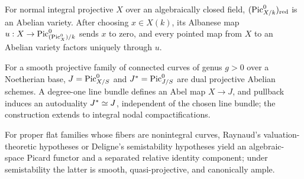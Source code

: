 \begin{remark}\label{kps-rmk-albanese}
For normal integral projective $X$ over an algebraically closed field,
$(\operatorname{Pic}^0_{X/k})_{\mathrm{red}}$ is an Abelian variety. After choosing
$x\in X(k)$, its Albanese map $u:X\to\operatorname{Pic}^0_{(\operatorname{Pic}^0_X)/k}$ sends $x$ to zero,
and every pointed map from $X$ to an Abelian variety factors uniquely through
$u$.
\end{remark}

\begin{remark}\label{kps-rmk-jacobian-autoduality}
For a smooth projective family of connected curves of genus $g>0$ over a
Noetherian base, $J=\operatorname{Pic}^0_{X/S}$ and $J^*=\operatorname{Pic}^0_{J/S}$ are dual projective
Abelian schemes. A degree-one line bundle defines an Abel map $X\to J$, and
pullback induces an autoduality $J^*\simeq J$, independent of the chosen line
bundle; the construction extends to integral nodal compactifications.
\end{remark}

\begin{remark}\label{kps-rmk-nonintegral-curves}
For proper flat families whose fibers are nonintegral curves, Raynaud's
valuation-theoretic hypotheses or Deligne's semistability hypotheses yield an
algebraic-space Picard functor and a separated relative identity component;
under semistability the latter is smooth, quasi-projective, and canonically
ample.
\end{remark}
